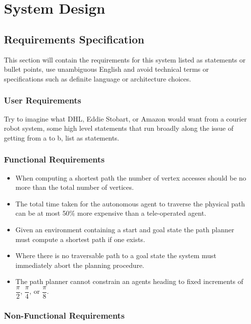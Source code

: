 \chapter{System Design}


\section{Requirements Specification}
This section will contain the requirements for this system listed as statements or bullet points, use unambiguous English and avoid technical terms or specifications such as definite language or architecture choices.

\subsection{User Requirements}
Try to imagine what DHL, Eddie Stobart, or Amazon would want from a courier robot system, some high level statements that run broadly along the issue of getting from a to b, list as statements.

\subsection{Functional Requirements}

\begin{itemize}
\item When computing a shortest path the number of vertex accesses should be no more than the total number of vertices.
\item The total time taken for the autonomous agent to traverse the physical path can be at most 50\% more expensive than a tele-operated agent.
\item Given an environment containing a start and goal state the path planner must compute a shortest path if one exists.
\item Where there is no traversable path to a goal state the system must immediately abort the planning procedure.
\item The path planner cannot constrain an agents heading to fixed increments of $\dfrac{\pi}{2}$, $\dfrac{\pi}{4}$, or $\dfrac{\pi}{8}$.
\end{itemize}

\subsection{Non-Functional Requirements}

